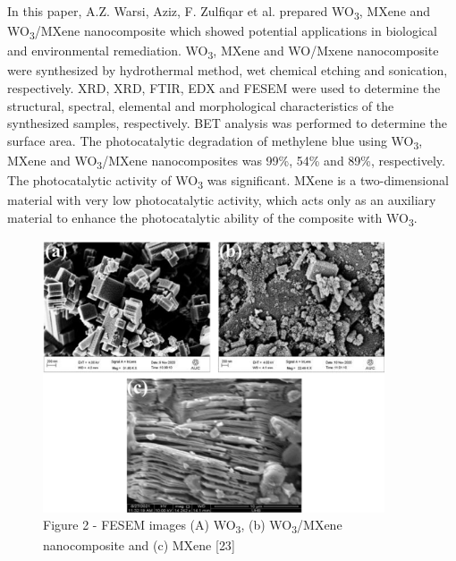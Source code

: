 \begin{multicols}{2}
In this paper, A.Z. Warsi, Aziz, F. Zulfiqar et al. prepared
WO\textsubscript{3}, MXene and WO\textsubscript{3}/MXene
nanocomposite which showed potential applications in biological
and environmental remediation. WO\textsubscript{3}, MXene and
WO/Mxene nanocomposite were synthesized by hydrothermal method,
wet chemical etching and sonication, respectively. XRD, XRD,
FTIR, EDX and FESEM were used to determine the structural,
spectral, elemental and morphological characteristics of the
synthesized samples, respectively. BET analysis was performed to
determine the surface area. The photocatalytic degradation of
methylene blue using WO\textsubscript{3}, MXene and
WO\textsubscript{3}/MXene nanocomposites was 99\%, 54\% and 89\%,
respectively. The photocatalytic activity of WO\textsubscript{3}
was significant. MXene is a two-dimensional material with very
low photocatalytic activity, which acts only as an auxiliary
material to enhance the photocatalytic ability of the composite
with WO\textsubscript{3}.
\end{multicols}

\begin{figure}[H]
	\centering
	\includegraphics[width=0.9\textwidth]{media/chem2/image13}
	\caption*{Figure 2 - FESEM images (A) WO\textsubscript{3}, (b) WO\textsubscript{3}/MXene nanocomposite and (c) MXene {[}23{]}}
\end{figure}

